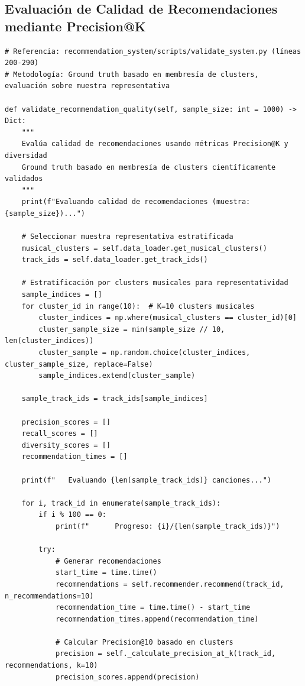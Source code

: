 \documentclass[12pt,a4paper]{report}
\begin{document}
\subsection{Evaluación de Calidad de Recomendaciones mediante Precision@K}

\begin{lstlisting}[caption={Metodología de Evaluación Precision@K con Ground Truth}]
# Referencia: recommendation_system/scripts/validate_system.py (líneas 200-290)
# Metodología: Ground truth basado en membresía de clusters, evaluación sobre muestra representativa

def validate_recommendation_quality(self, sample_size: int = 1000) -> Dict:
    """
    Evalúa calidad de recomendaciones usando métricas Precision@K y diversidad
    Ground truth basado en membresía de clusters científicamente validados
    """
    print(f"Evaluando calidad de recomendaciones (muestra: {sample_size})...")

    # Seleccionar muestra representativa estratificada
    musical_clusters = self.data_loader.get_musical_clusters()
    track_ids = self.data_loader.get_track_ids()

    # Estratificación por clusters musicales para representatividad
    sample_indices = []
    for cluster_id in range(10):  # K=10 clusters musicales
        cluster_indices = np.where(musical_clusters == cluster_id)[0]
        cluster_sample_size = min(sample_size // 10, len(cluster_indices))
        cluster_sample = np.random.choice(cluster_indices, cluster_sample_size, replace=False)
        sample_indices.extend(cluster_sample)

    sample_track_ids = track_ids[sample_indices]

    precision_scores = []
    recall_scores = []
    diversity_scores = []
    recommendation_times = []

    print(f"   Evaluando {len(sample_track_ids)} canciones...")

    for i, track_id in enumerate(sample_track_ids):
        if i % 100 == 0:
            print(f"      Progreso: {i}/{len(sample_track_ids)}")

        try:
            # Generar recomendaciones
            start_time = time.time()
            recommendations = self.recommender.recommend(track_id, n_recommendations=10)
            recommendation_time = time.time() - start_time
            recommendation_times.append(recommendation_time)

            # Calcular Precision@10 basado en clusters
            precision = self._calculate_precision_at_k(track_id, recommendations, k=10)
            precision_scores.append(precision)


\end{lstlisting}
\end{document}
